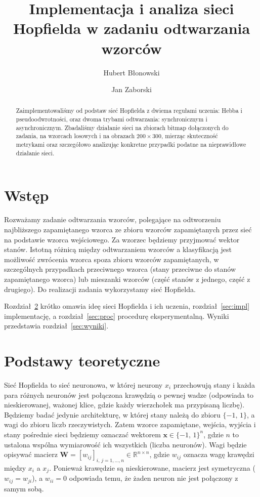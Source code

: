 \documentclass{article}
\title{Implementacja i analiza sieci Hopfielda w zadaniu odtwarzania wzorców}
\author{Hubert Błonowski \and Jan Zaborski}
\date{}
\begin{document}
\maketitle

\begin{abstract}
Zaimplementowaliśmy od podstaw sieć Hopfielda z dwiema regułami uczenia: Hebba i pseudoodwrotności,
oraz dwoma trybami odtwarzania: synchronicznym i asynchronicznym.
Zbadaliśmy działanie sieci na zbiorach bitmap dołączonych do zadania, na wzorcach losowych i na obrazach $200 \times 300$, mierząc skuteczność metrykami
oraz szczegółowo analizując konkretne przypadki podatne na nieprawidłowe działanie sieci.
\end{abstract}

\tableofcontents

\section{Wstęp}
Rozważamy zadanie odtwarzania wzorców, polegające na odtworzeniu najbliższego zapamiętanego wzorca
ze zbioru wzorców zapamiętanych przez sieć na podstawie wzorca wejściowego.
Za wzorzec będziemy przyjmować wektor stanów.
Istotną różnicą między odtwarzaniem wzorców a klasyfikacją jest możliwość zwrócenia wzorca spoza zbioru wzorców zapamiętanych,
w szczególnych przypadkach przeciwnego wzorca (stany przeciwne do stanów zapamiętanego wzorca) lub mieszanki wzorców (część stanów z jednego, część z drugiego).
Do realizacji zadania wykorzystamy sieć Hopfielda.

Rozdział~\ref{sec:teoria} krótko omawia ideę sieci Hopfielda i ich uczenia,
rozdział~\ref{sec:impl} implementację,
a rozdział~\ref{sec:proc} procedurę eksperymentalną.
Wyniki przedstawia rozdział~\ref{sec:wyniki}.

\section{Podstawy teoretyczne}
\label{sec:teoria}

Sieć Hopfielda to sieć neuronowa, w której neurony $x_i$ przechowują stany
i każda para różnych neuronów jest połączona krawędzią o pewnej wadze (odpowiada to nieskierowanej, ważonej klice, gdzie każdy wierzchołek ma przypisaną liczbę).
Będziemy badać jedynie architekturę, w której stany należą do zbioru $\{-1,\, 1\}$, a wagi do zbioru liczb rzeczywistych.
Zatem wzorce zapamiętane, wejścia, wyjścia i stany pośrednie sieci będziemy oznaczać wektorem $\mathbf{x} \in \{-1,\, 1\}^{n}$,
gdzie $n$ to ustalona wspólna wymiarowość ich wszystkich (liczba neuronów).
Wagi będzie opisywać macierz $\mathbf{W} = \left[w_{ij}\right]_{i,\, j = 1, \ldots, n} \in \mathbb{R}^{n \times n}$,
gdzie $w_{ij}$ oznacza wagę krawędzi między $x_i$ a $x_j$.
Ponieważ krawędzie są nieskierowane, macierz jest symetryczna ($w_{ij} = w_{ji}$),
a $w_{ii} = 0$ odpowiada temu, że żaden neuron nie jest połączony z samym sobą.
\end{document}
